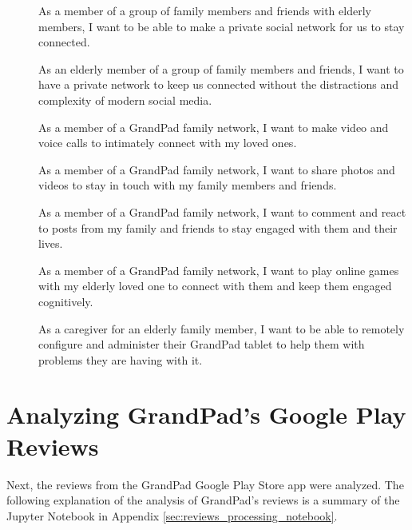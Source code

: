 \begin{description}
    \item[\textbf{\showusernetcounter}]
        As a member of a group of family members and friends with elderly
            members, I want to be able to make a private social network for us
            to stay connected.
    \item[\textbf{\showusernetcounter}]
        As an elderly member of a group of family members and friends, I want to
            have a private network to keep us connected without the distractions
            and complexity of modern social media.
    \item[\textbf{\showusercallcounter}]
        As a member of a GrandPad family network, I want to make video and voice
            calls to intimately connect with my loved ones.
    \item[\textbf{\showuserpostcounter}]
        As a member of a GrandPad family network, I want to share photos and
            videos to stay in touch with my family members and friends.
    \item[\textbf{\showuserpostcounter}]
        As a member of a GrandPad family network, I want to comment and react to
            posts from my family and friends to stay engaged with them and their
            lives.
    \item[\textbf{\showusergamecounter}]
        As a member of a GrandPad family network, I want to play online games
            with my elderly loved one to connect with them and keep them engaged
            cognitively.
    \item[\textbf{\showusernetcounter}]
        As a caregiver for an elderly family member, I want to be able to
            remotely configure and administer their GrandPad tablet to help them
            with problems they are having with it.
\end{description}

\section*{Analyzing GrandPad's Google Play Reviews}

Next, the reviews from the GrandPad Google Play Store app were analyzed.
The following explanation of the analysis of GrandPad's reviews is a summary of
    the Jupyter Notebook in Appendix \ref{sec:reviews_processing_notebook}.

